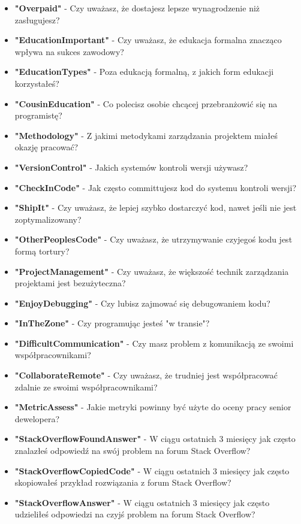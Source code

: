 \begin{appendices}
\begin{itemize}
        \item \textbf{"Overpaid"} - Czy uważasz, że dostajesz lepsze wynagrodzenie niż zasługujesz?
        \item \textbf{"EducationImportant"} - Czy uważasz, że edukacja formalna znacząco wpływa na sukces zawodowy?
        \item \textbf{"EducationTypes"} - Poza edukacją formalną, z jakich form edukacji korzystałeś?
        \item \textbf{"CousinEducation"} - Co polecisz osobie chcącej przebranżowić się na programistę?
        \item \textbf{"Methodology"} - Z jakimi metodykami zarządzania projektem miałeś okazję pracować?
        \item \textbf{"VersionControl"} - Jakich systemów kontroli wersji używasz?
        \item \textbf{"CheckInCode"} - Jak często committujesz kod do systemu kontroli wersji?
        \item \textbf{"ShipIt"} - Czy uważasz, że lepiej szybko dostarczyć kod, nawet jeśli nie jest zoptymalizowany?
        \item \textbf{"OtherPeoplesCode"} - Czy uważasz, że utrzymywanie czyjegoś kodu jest formą tortury?
        \item \textbf{"ProjectManagement"} - Czy uważasz, że większość technik zarządzania projektami jest bezużyteczna?
        \item \textbf{"EnjoyDebugging"} - Czy lubisz zajmować się debugowaniem kodu?
        \item \textbf{"InTheZone"} - Czy programując jesteś "w transie"?
        \item \textbf{"DifficultCommunication"} - Czy masz problem z komunikacją ze swoimi współpracownikami?
        \item \textbf{"CollaborateRemote"} - Czy uważasz, że trudniej jest współpracować zdalnie ze swoimi współpracownikami?
        \item \textbf{"MetricAssess"} - Jakie metryki powinny być użyte do oceny pracy senior dewelopera?
        \item \textbf{"StackOverflowFoundAnswer"} - W ciągu ostatnich 3 miesięcy jak często znalazłeś odpowiedź na swój problem na forum Stack Overflow?
        \item \textbf{"StackOverflowCopiedCode"} - W ciągu ostatnich 3 miesięcy jak często skopiowałeś przykład rozwiązania z forum Stack Overflow?
        \item \textbf{"StackOverflowAnswer"} - W ciągu ostatnich 3 miesięcy jak często udzieliłeś odpowiedzi na czyjś problem na forum Stack Overflow?

\end{itemize}
\end{appendices}
